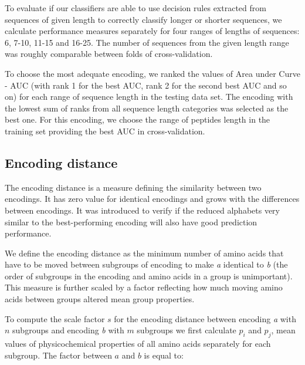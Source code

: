 \documentclass[a4,center,fleqn]{NAR}
\begin{document}
  To evaluate if our classifiers are able to use decision rules extracted from 
sequences of given length to correctly classify longer or shorter sequences, we 
calculate performance measures separately for four ranges of lengths of 
sequences: 6, 7-10, 11-15 and 16-25. The number of sequences from the given 
%
%
%
length range was roughly comparable between folds of cross-validation.
  
  To choose the most adequate encoding, we ranked the values 
%
%
%
of Area under Curve - AUC (with rank 1 for the best AUC, rank 2 for the second 
best AUC and so on) for each range of sequence length in the testing data set. 
The encoding with the lowest sum of ranks from all sequence length categories 
was selected as the best one. For this encoding, we choose the range of peptides 
length in the training set providing the best AUC in cross-validation.

\subsection{Encoding distance}
The encoding distance is a measure defining the similarity between two 
encodings. It has zero value for identical encodings and grows with the 
differences between encodings. It was introduced to verify if the reduced 
alphabets very similar to the best-performing encoding will also have good 
prediction performance.

  We define the encoding distance as the minimum number of amino acids that 
have to be moved between subgroups of encoding to make \textit{a} identical to 
\textit{b} (the order of subgroups in the encoding and amino acids in a group 
is unimportant). This measure is further scaled by a factor reflecting how 
much moving amino acids between groups altered mean group properties. 

To compute the scale factor $s$ for the encoding distance between 
encoding \textit{a} with $n$ subgroups and encoding \textit{b} with $m$ 
subgroups we first calculate $p_i$ and $p_j$, mean values of physicochemical 
properties of all amino acids separately for each subgroup. The factor between 
%
%
%
$a$ and $b$ is equal to: 
\end{document}
